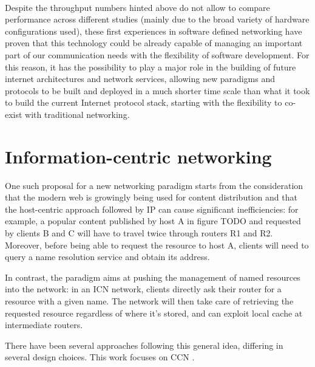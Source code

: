 \documentclass[11pt,a4paper,twoside,titlepage,openany]{book}
\begin{document}
\paragraph{} Despite the throughput numbers hinted above do not allow to compare performance across different studies (mainly due to the broad variety of hardware configurations used), these first experiences in software defined networking have proven that this technology could be already capable of managing an important part of our communication needs with the flexibility of software development. For this reason, it has the possibility to play a major role in the building of future internet architectures and network services, allowing new paradigms and protocols to be built and deployed in a much shorter time scale than what it took to build the current Internet protocol stack, starting with the flexibility to co-exist with traditional networking.

\section{Information-centric networking}
One such proposal for a new networking paradigm starts from the consideration that the modern web is growingly being used for content distribution and that the host-centric approach followed by IP can cause significant inefficiencies: for example, a popular content published by host A in figure TODO
and requested by clients B and C will have to travel twice through routers R1 and R2. Moreover, before being able to request the resource to host A, clients will need to query a name resolution service and obtain its address.

In contrast, the  paradigm aims at pushing the management of named resources into the network: in an ICN network, clients directly ask their router for a resource with a given name. The network will then take care of retrieving the requested resource regardless of where it's stored, and can exploit local cache at intermediate routers.


There have been several approaches following this general idea, differing in several design choices. This work focuses on \gls{CCN} \cite{ccn}.
\end{document}
